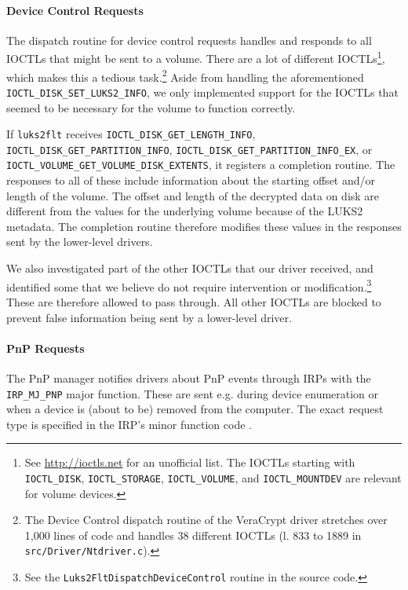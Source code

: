 \paragraph{Device Control Requests} The dispatch routine for device control requests handles and responds to all IOCTLs that might be sent to a volume. There are a lot of different IOCTLs\footnote{\label{fn:ourapproach.final.ioctls} See \url{http://ioctls.net} for an unofficial list. The IOCTLs starting with \texttt{IOCTL\_DISK}, \texttt{IOCTL\_STORAGE}, \texttt{IOCTL\_VOLUME}, and \texttt{IOCTL\_MOUNTDEV} are relevant for volume devices.}, which makes this a tedious task.\footnote{\label{fn:ourapproach.final.veracryptioctls} The Device Control dispatch routine of the VeraCrypt driver stretches over 1,000 lines of code and handles 38 different IOCTLs (l. 833 to 1889 in \texttt{src/Driver/Ntdriver.c}).} Aside from handling the aforementioned \texttt{IOCTL\_DISK\_SET\_LUKS2\_INFO}, we only implemented support for the IOCTLs that seemed to be necessary for the volume to function correctly.

If \texttt{luks2flt} receives \texttt{IOCTL\_DISK\_GET\_LENGTH\_INFO}, \texttt{IOCTL\_DISK\_GET\_PARTITION\_INFO}, \texttt{IOCTL\_DISK\_GET\_PARTITION\_INFO\_EX}, or \texttt{IOCTL\_VOLUME\_GET\_VOLUME\_DISK\_EXTENTS}, it registers a completion routine. The responses to all of these include information about the starting offset and/or length of the volume. The offset and length of the decrypted data on disk are different from the values for the underlying volume because of the LUKS2 metadata. The completion routine therefore modifies these values in the responses sent by the lower-level drivers.

We also investigated part of the other IOCTLs that our driver received, and identified some that we believe do not require intervention or modification.\footnote{\label{fn:ourapproach.final.unproblematicioctls} See the \texttt{Luks2FltDispatchDeviceControl} routine in the source code.} These are therefore allowed to pass through. All other IOCTLs are blocked to prevent false information being sent by a lower-level driver.

\paragraph{PnP Requests} The PnP manager notifies drivers about PnP events through IRPs with the \texttt{IRP\_MJ\_PNP} major function. These are sent e.g. during device enumeration or when a device is (about to be) removed from the computer. The exact request type is specified in the IRP's minor function code \cite{Kerneldriver}.

